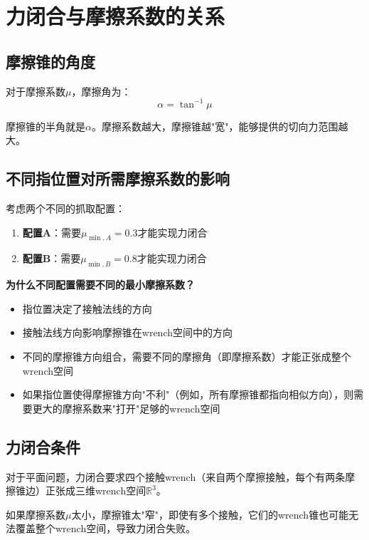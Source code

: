 \documentclass[12pt,a4paper]{article}
\begin{document}
\section{力闭合与摩擦系数的关系}

\subsection{摩擦锥的角度}

对于摩擦系数$\mu$，摩擦角为：
\begin{equation}
\alpha = \tan^{-1} \mu
\end{equation}

摩擦锥的半角就是$\alpha$。摩擦系数越大，摩擦锥越"宽"，能够提供的切向力范围越大。

\subsection{不同指位置对所需摩擦系数的影响}

考虑两个不同的抓取配置：

\begin{enumerate}
    \item \textbf{配置A}：需要$\mu_{\min,A} = 0.3$才能实现力闭合
    \item \textbf{配置B}：需要$\mu_{\min,B} = 0.8$才能实现力闭合
\end{enumerate}

\textbf{为什么不同配置需要不同的最小摩擦系数？}

\begin{itemize}
    \item 指位置决定了接触法线的方向
    \item 接触法线方向影响摩擦锥在wrench空间中的方向
    \item 不同的摩擦锥方向组合，需要不同的摩擦角（即摩擦系数）才能正张成整个wrench空间
    \item 如果指位置使得摩擦锥方向"不利"（例如，所有摩擦锥都指向相似方向），则需要更大的摩擦系数来"打开"足够的wrench空间
\end{itemize}

\subsection{力闭合条件}

对于平面问题，力闭合要求四个接触wrench（来自两个摩擦接触，每个有两条摩擦锥边）正张成三维wrench空间$\mathbb{R}^3$。

如果摩擦系数$\mu$太小，摩擦锥太"窄"，即使有多个接触，它们的wrench锥也可能无法覆盖整个wrench空间，导致力闭合失败。
\end{document}
